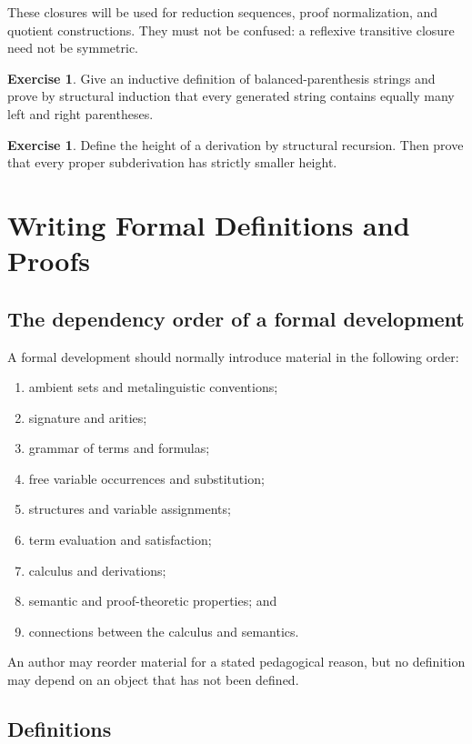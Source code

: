 \documentclass[11pt,oneside,openany]{book}
\theoremstyle{definition}
\newtheorem{exercise}[definition]{Exercise}
\theoremstyle{plain}
\theoremstyle{remark}
\begin{document}
These closures will be used for reduction sequences, proof normalization, and
quotient constructions.  They must not be confused: a reflexive transitive
closure need not be symmetric.

\begin{exercise}
\label{ex:strings-01}
Give an inductive definition of balanced-parenthesis strings and prove by
structural induction that every generated string contains equally many left
and right parentheses.
\end{exercise}

\begin{exercise}
\label{ex:strings-02}
Define the height of a derivation by structural recursion.  Then prove that
every proper subderivation has strictly smaller height.
\end{exercise}

\chapter{Writing Formal Definitions and Proofs}
\label{ch:writing-foundations}

\section{The dependency order of a formal development}
\label{sec:writing-foundations-01}

A formal development should normally introduce material in the following
order:
\begin{enumerate}
  \item ambient sets and metalinguistic conventions;
  \item signature and arities;
  \item grammar of terms and formulas;
  \item free variable occurrences and substitution;
  \item structures and variable assignments;
  \item term evaluation and satisfaction;
  \item calculus and derivations;
  \item semantic and proof-theoretic properties; and
  \item connections between the calculus and semantics.
\end{enumerate}
An author may reorder material for a stated pedagogical reason, but no
definition may depend on an object that has not been defined.

\section{Definitions}
\label{sec:writing-foundations-02}
\end{document}
